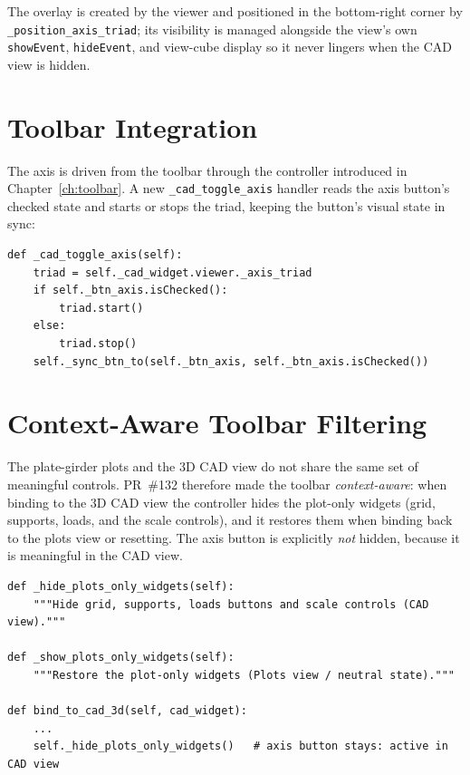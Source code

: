 The overlay is created by the viewer and positioned in the bottom-right corner by
\texttt{\_position\_axis\_triad}; its visibility is managed alongside the view's own
\texttt{showEvent}, \texttt{hideEvent}, and view-cube display so it never lingers when the CAD
view is hidden.

\section{Toolbar Integration}
The axis is driven from the toolbar through the controller introduced in
Chapter~\ref{ch:toolbar}. A new \texttt{\_cad\_toggle\_axis} handler reads the axis button's
checked state and starts or stops the triad, keeping the button's visual state in sync:

\begin{lstlisting}[caption={Toolbar handler for the axis toggle (\texttt{toolbar\_controller.py}).},label={lst:axistoggle}]
def _cad_toggle_axis(self):
    triad = self._cad_widget.viewer._axis_triad
    if self._btn_axis.isChecked():
        triad.start()
    else:
        triad.stop()
    self._sync_btn_to(self._btn_axis, self._btn_axis.isChecked())
\end{lstlisting}

\section{Context-Aware Toolbar Filtering}
The plate-girder plots and the 3D CAD view do not share the same set of meaningful controls.
PR~\#132 therefore made the toolbar \emph{context-aware}: when binding to the 3D CAD view the
controller hides the plot-only widgets (grid, supports, loads, and the scale controls), and it
restores them when binding back to the plots view or resetting. The axis button is explicitly
\emph{not} hidden, because it is meaningful in the CAD view.

\begin{lstlisting}[caption={Hiding and restoring plot-only widgets per active view (\texttt{toolbar\_controller.py}).},label={lst:filter}]
def _hide_plots_only_widgets(self):
    """Hide grid, supports, loads buttons and scale controls (CAD view)."""

def _show_plots_only_widgets(self):
    """Restore the plot-only widgets (Plots view / neutral state)."""

def bind_to_cad_3d(self, cad_widget):
    ...
    self._hide_plots_only_widgets()   # axis button stays: active in CAD view
\end{lstlisting}

